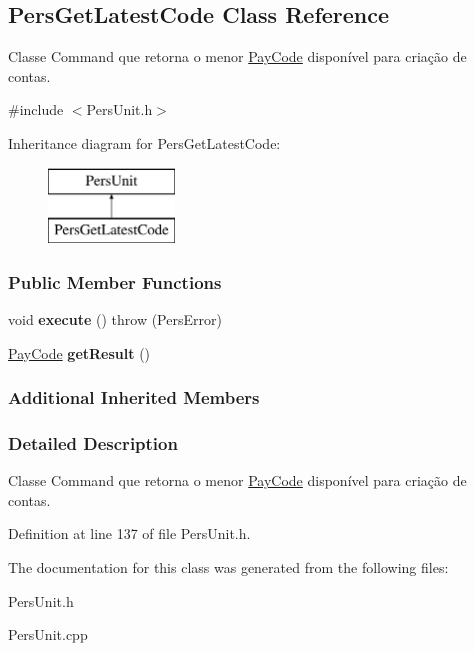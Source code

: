 \hypertarget{classPersGetLatestCode}{\subsection{Pers\-Get\-Latest\-Code Class Reference}
\label{d8/d77/classPersGetLatestCode}
}


Classe Command que retorna o menor \hyperlink{classPayCode}{Pay\-Code} disponível para criação de contas.  




{\ttfamily \#include $<$Pers\-Unit.\-h$>$}

Inheritance diagram for Pers\-Get\-Latest\-Code\-:\begin{figure}[H]
\begin{center}
\leavevmode
\includegraphics[height=2.000000cm]{d8/d77/classPersGetLatestCode}
\end{center}
\end{figure}
\subsubsection*{Public Member Functions}
\begin{DoxyCompactItemize}
\item 
\hypertarget{classPersGetLatestCode_ad053433ea59b9c3caa4b1baf702add8f}{void {\bfseries execute} ()  throw (\-Pers\-Error)}\label{d8/d77/classPersGetLatestCode_ad053433ea59b9c3caa4b1baf702add8f}

\item 
\hypertarget{classPersGetLatestCode_aa036c4249daec1f19e63c1411f8bd988}{\hyperlink{classPayCode}{Pay\-Code} {\bfseries get\-Result} ()}\label{d8/d77/classPersGetLatestCode_aa036c4249daec1f19e63c1411f8bd988}

\end{DoxyCompactItemize}
\subsubsection*{Additional Inherited Members}


\subsubsection{Detailed Description}
Classe Command que retorna o menor \hyperlink{classPayCode}{Pay\-Code} disponível para criação de contas. 

Definition at line 137 of file Pers\-Unit.\-h.



The documentation for this class was generated from the following files\-:\begin{DoxyCompactItemize}
\item 
Pers\-Unit.\-h\item 
Pers\-Unit.\-cpp\end{DoxyCompactItemize}
